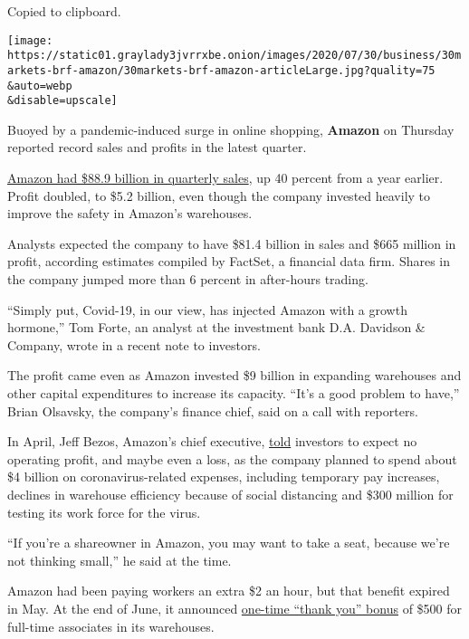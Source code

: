 Copied to clipboard.

\texttt{[image: https://static01.graylady3jvrrxbe.onion/images/2020/07/30/business/30markets-brf-amazon/30markets-brf-amazon-articleLarge.jpg?quality=75\\\&auto=webp\\\&disable=upscale]}

Buoyed by a pandemic-induced surge in online shopping, \textbf{Amazon}
on Thursday reported record sales and profits in the latest quarter.

\href{https://www.nytimes3xbfgragh.onion/2020/05/22/technology/amazon-coronavirus-target-walmart.html}{Amazon
had \$88.9 billion in quarterly sales}, up 40 percent from a year
earlier. Profit doubled, to \$5.2 billion, even though the company
invested heavily to improve the safety in Amazon's warehouses.

Analysts expected the company to have \$81.4 billion in sales and \$665
million in profit, according estimates compiled by FactSet, a financial
data firm. Shares in the company jumped more than 6 percent in
after-hours trading.

``Simply put, Covid-19, in our view, has injected Amazon with a growth
hormone,'' Tom Forte, an analyst at the investment bank D.A. Davidson \&
Company, wrote in a recent note to investors.

The profit came even as Amazon invested \$9 billion in expanding
warehouses and other capital expenditures to increase its capacity.
``It's a good problem to have,'' Brian Olsavsky, the company's finance
chief, said on a call with reporters.

In April, Jeff Bezos, Amazon's chief executive,
\href{https://www.nytimes3xbfgragh.onion/2020/04/30/technology/amazon-stock-earnings-report.html}{told}
investors to expect no operating profit, and maybe even a loss, as the
company planned to spend about \$4 billion on coronavirus-related
expenses, including temporary pay increases, declines in warehouse
efficiency because of social distancing and \$300 million for testing
its work force for the virus.

``If you're a shareowner in Amazon, you may want to take a seat, because
we're not thinking small,'' he said at the time.

Amazon had been paying workers an extra \$2 an hour, but that benefit
expired in May. At the end of June, it announced
\href{https://blog.aboutamazon.com/operations/a-thank-you-bonus-for-amazon-front-line-employees-and-partners}{one-time
``thank you'' bonus} of \$500 for full-time associates in its
warehouses.

